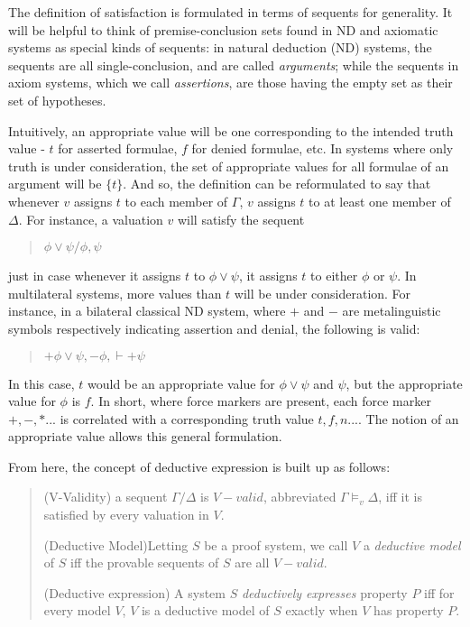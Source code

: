 \documentclass[]{article}
\begin{document}
The definition of satisfaction is formulated in terms of sequents for generality. It will be helpful to think of premise-conclusion sets found in ND and axiomatic systems as special kinds of sequents: in natural deduction (ND) systems, the sequents are all single-conclusion, and are called \textit{arguments}; while the sequents in axiom systems, which we call \textit{assertions}, are those having the empty set as their set of hypotheses.

Intuitively, an appropriate value will be one corresponding to the intended truth value - $t$ for asserted formulae, $f$ for denied formulae, etc. In systems where only truth is under consideration, the set of appropriate values for all formulae of an argument will be $\{t\}$. And so, the definition can be reformulated to say that whenever $v$ assigns $t$ to each member of $\Gamma$, $v$ assigns $t$ to at least one member of $\Delta$. For instance, a valuation $v$ will satisfy the sequent 
\begin{quote}$\phi\vee\psi / \phi, \psi$ 
\end{quote}
just in case whenever it assigns $t$ to $\phi\vee\psi$, it assigns $t$ to either $\phi$ or $\psi$. In multilateral systems, more values than $t$ will be under consideration. For instance, in a bilateral classical ND system, where $+$ and $-$ are metalinguistic symbols respectively indicating assertion and denial, the following is valid:
\begin{quote}
$+\phi\vee\psi, -\phi, \vdash +\psi$
\end{quote}

In this case, $t$ would be an appropriate value for $\phi\vee\psi$ and $\psi$, but the appropriate value for $\phi$ is $f$. In short, where force markers are present, each force marker $+, -, * ...$ is correlated with a corresponding truth value $t, f, n...$. The notion of an appropriate value allows this general formulation.

From here, the concept of deductive expression is built up as follows:

\begin{quote}
(V-Validity) a sequent $\Gamma / \Delta$ is $V-valid$, abbreviated $\Gamma \models_{v} \Delta$, iff it is satisfied by every valuation in $V$.

(Deductive Model)Letting $S$ be a proof system, we call $V$ a \textit{deductive model} of $S$ iff the provable sequents of $S$ are all $V-valid$.

(Deductive expression) A system $S$ \textit{deductively expresses} property $P$ iff for every model $V$, $V$ is a deductive model of $S$ exactly when $V$ has property $P$.
\end{quote}
\end{document}
